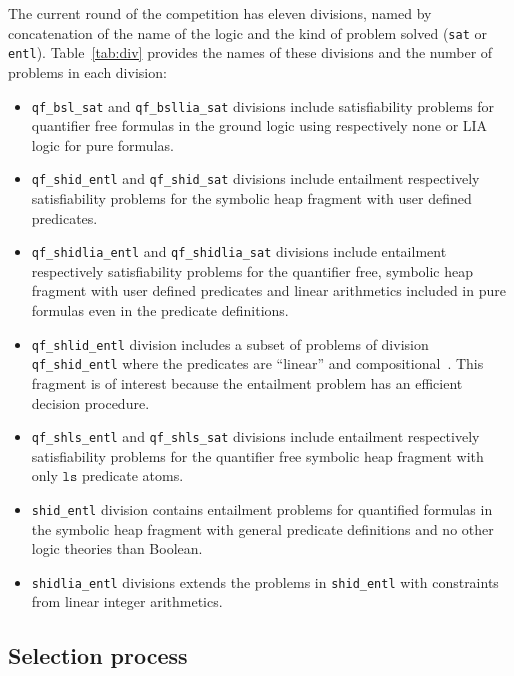 \documentclass[orivec]{llncs}
\newcommand{\ls}{\mathtt{ls}}
\begin{document}
The current round of the competition has eleven divisions, named 
by concatenation of the name of the logic and the kind of problem solved
(\texttt{sat} or \texttt{entl}).
Table~\ref{tab:div} provides the names of these divisions and the number of problems
in each division:
\begin{itemize}
\item \texttt{qf\_bsl\_sat} and \texttt{qf\_bsllia\_sat} divisions 
	include satisfiability problems for quantifier free formulas in the ground logic
	using respectively none or LIA logic for pure formulas.

\item \texttt{qf\_shid\_entl} and \texttt{qf\_shid\_sat} divisions
   include entailment respectively satisfiability problems for the 
   symbolic heap fragment with user defined predicates.

\item \texttt{qf\_shidlia\_entl} and \texttt{qf\_shidlia\_sat} divisions
   include entailment respectively satisfiability problems for the 
   quantifier free, symbolic heap fragment with 
   user defined predicates and linear arithmetics
   included in pure formulas even in the predicate definitions.

\item \texttt{qf\_shlid\_entl} division
   includes a subset of problems of division \texttt{qf\_shid\_entl}
   where the predicates are ``linear'' and compositional~\cite{DBLP:conf/atva/EneaSW15}.
   This fragment is of interest because the entailment problem has
   an efficient decision procedure.

\item \texttt{qf\_shls\_entl} and \texttt{qf\_shls\_sat} divisions
   include entailment respectively satisfiability problems for the 
   quantifier free symbolic heap fragment with only $\ls$ predicate atoms.

\item \texttt{shid\_entl} division contains entailment problems
   for quantified formulas in the symbolic heap fragment with general 
   predicate definitions and no other logic theories than Boolean.
   
\item \texttt{shidlia\_entl} divisions extends the problems in
   \texttt{shid\_entl} with constraints from linear integer arithmetics.
   
\end{itemize}


\subsection{Selection process}
\end{document}
